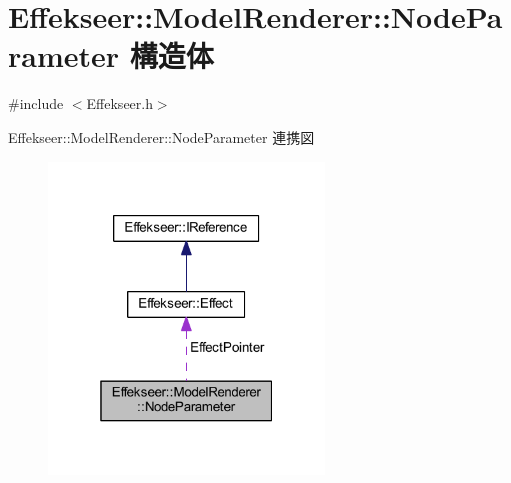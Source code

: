 \hypertarget{struct_effekseer_1_1_model_renderer_1_1_node_parameter}{}\section{Effekseer\+:\+:Model\+Renderer\+:\+:Node\+Parameter 構造体}
\label{struct_effekseer_1_1_model_renderer_1_1_node_parameter}


{\ttfamily \#include $<$Effekseer.\+h$>$}



Effekseer\+:\+:Model\+Renderer\+:\+:Node\+Parameter 連携図\nopagebreak
\begin{figure}[H]
\begin{center}
\leavevmode
\includegraphics[width=208pt]{struct_effekseer_1_1_model_renderer_1_1_node_parameter__coll__graph}
\end{center}
\end{figure}
